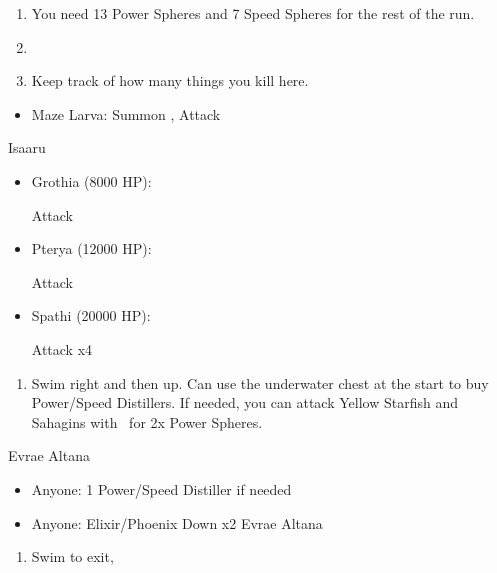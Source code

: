 \begin{enumerate}[resume]
	\item You need 13 Power Spheres and 7 Speed Spheres for the rest of the run.
	\item \save
	\item Keep track of how many things you kill here.
\end{enumerate}
\begin{encounters}
	\begin{itemize}
		\item Maze Larva: Summon \ixion, Attack
	\end{itemize}
\end{encounters}
\bothvfill
\winvfill
\lossvfill
\begin{battle}{Isaaru}
	\begin{itemize}
		\item Grothia (8000 HP):
		      \begin{itemize}
			      \summon{\bahamut}
			      \bahamutf Attack
		      \end{itemize}
		\item Pterya (12000 HP):
		      \begin{itemize}
			      \summon{\bahamut}
			      \bahamutf Attack
		      \end{itemize}
		\item Spathi (20000 HP):
		      \begin{itemize}
			      \summon{\ixion}
			      \ixionf Attack x4
		      \end{itemize}
	\end{itemize}
\end{battle}
\begin{enumerate}[resume]
	\item Swim right and then up. Can use the underwater chest at the start to buy Power/Speed Distillers. If needed, you can attack Yellow Starfish and Sahagins with \tidus\ for 2x Power Spheres.
\end{enumerate}
\begin{battle}{Evrae Altana}
	\begin{itemize}
		\item Anyone: 1 Power/Speed Distiller if needed
		\item Anyone: Elixir/Phoenix Down x2 Evrae Altana
	\end{itemize}
\end{battle}
\begin{enumerate}[resume]
	\item Swim to exit, \sd
\end{enumerate}
\ 
\bothvfill
\ \bothnewline
\bothcb
\ 

\bothnpsingle